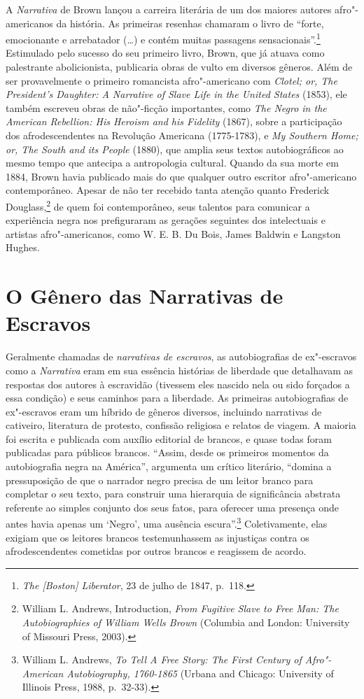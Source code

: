 A \emph{Narrativa} de Brown
lançou a carreira literária de um dos maiores autores afro"-americanos da
história. As primeiras resenhas chamaram o livro de ``forte, emocionante
e arrebatador (\ldots{}) e contém muitas passagens sensacionais''.\footnote{\emph{The {[}Boston{]} Liberator}, 23 de julho de 1847, p.~118.} Estimulado
pelo sucesso do seu primeiro livro, Brown, que já atuava como
palestrante abolicionista, publicaria obras de vulto em diversos
gêneros. Além de ser provavelmente o primeiro romancista afro"-americano
com \emph{Clotel; or, The President's Daughter: A Narrative of Slave
Life in the United States} (1853), ele também escreveu obras de
não"-ficção importantes, como \emph{The Negro in the American Rebellion:
His Heroism and his Fidelity} (1867), sobre a participação dos
afrodescendentes na Revolução Americana (1775-1783), e \emph{My Southern
Home; or, The South and its People} (1880), que amplia seus textos
autobiográficos ao mesmo tempo que antecipa a antropologia cultural.
Quando da sua morte em 1884, Brown havia publicado mais do que qualquer
outro escritor afro"-americano contemporâneo. Apesar de não ter recebido
tanta atenção quanto Frederick Douglass,\footnote{William L. Andrews,
  Introduction, \emph{From Fugitive Slave to Free Man: The
  Autobiographies of William Wells Brown} (Columbia and London:
  University of Missouri Press, 2003).} de quem foi contemporâneo, seus
talentos para comunicar a experiência negra nos  prefiguraram as
gerações seguintes dos intelectuais e artistas afro"-americanos, como W.
E. B. Du Bois, James Baldwin e Langston Hughes.

\section{O Gênero das Narrativas de Escravos}

Geralmente chamadas de \emph{narrativas de escravos}, as autobiografias
de ex"-escravos como a \emph{Narrativa} eram em sua essência histórias de
liberdade que detalhavam as respostas dos autores à escravidão (tivessem
eles nascido nela ou sido forçados a essa condição) e seus caminhos para
a liberdade. As primeiras autobiografias de ex"-escravos eram um híbrido
de gêneros diversos, incluindo narrativas de cativeiro, literatura de
protesto, confissão religiosa e relatos de viagem. A maioria foi escrita
e publicada com auxílio editorial de brancos, e quase todas foram
publicadas para públicos brancos. ``Assim, desde os primeiros momentos
da autobiografia negra na América'', argumenta um crítico literário,
``domina a pressuposição de que o narrador negro precisa de um leitor
branco para completar o seu texto, para construir uma hierarquia de
significância abstrata referente ao simples conjunto dos seus fatos,
para oferecer uma presença onde antes havia apenas um `Negro', uma
ausência escura''.\footnote{William L. Andrews, \emph{To Tell A Free
  Story: The First Century of Afro"-American Autobiography, 1760-1865}
  (Urbana and Chicago: University of Illinois Press, 1988, p.~32-33).}
Coletivamente, elas exigiam que os leitores brancos testemunhassem as
injustiças contra os afrodescendentes cometidas por outros brancos e
reagissem de acordo.

